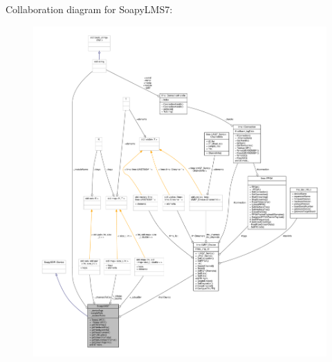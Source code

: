 Collaboration diagram for Soapy\+L\+M\+S7\+:
\nopagebreak
\begin{figure}[H]
\begin{center}
\leavevmode
\includegraphics[width=350pt]{d9/de3/classSoapyLMS7__coll__graph}
\end{center}
\end{figure}
